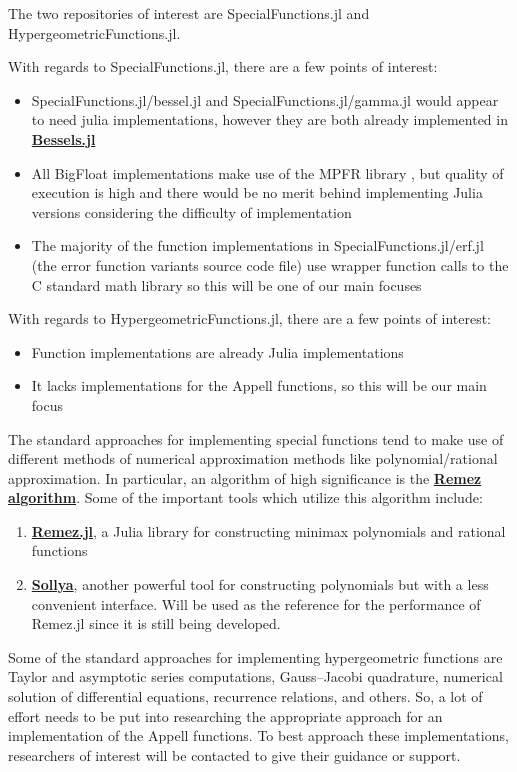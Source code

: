 \documentclass{article}
\theoremstyle{mytheoremstyle}
\theoremstyle{mytheoremstyle}
\theoremstyle{myproblemstyle}
\begin{document}
      The two repositories of interest are SpecialFunctions.jl and HypergeometricFunctions.jl. 

   \medskip
      With regards to SpecialFunctions.jl, there are a few points of interest: \begin{itemize}
        \item SpecialFunctions.jl/bessel.jl and SpecialFunctions.jl/gamma.jl would appear to need julia implementations, however they are both already implemented in \href{https://github.com/JuliaMath/Bessels.jl/tree/master}{\textbf{Bessels.jl}} 
        \item All BigFloat implementations make use of the MPFR library \cite{mpfr}, but quality of execution is high and there would be no merit behind implementing Julia versions considering the difficulty of implementation
        \item The majority of the function implementations in SpecialFunctions.jl/erf.jl (the error function variants source code file) use wrapper function calls to the C standard math library \cite{gnu clib} so this will be one of our main focuses
      \end{itemize}

      With regards to HypergeometricFunctions.jl, there are a few points of interest: \begin{itemize}
        \item Function implementations are already Julia implementations
        \item It lacks implementations for the Appell functions, so this will be our main focus
      \end{itemize}

      The standard approaches for implementing special functions tend to make use of different methods of numerical approximation methods like polynomial/rational approximation. 
      In particular, an algorithm of high significance is the \href{https://en.wikipedia.org/wiki/Remez_algorithm}{\textbf{Remez algorithm}}.
      Some of the important tools which utilize this algorithm include: \begin{enumerate}
        \item \href{https://github.com/simonbyrne/Remez.jl}{\textbf{Remez.jl}}, a Julia library for constructing minimax polynomials and rational functions 
        \item \href{https://www.sollya.org/}{\textbf{Sollya}}, another powerful tool for constructing polynomials but with a less convenient interface. Will be used as the reference for the performance of Remez.jl since it is still being developed.
      \end{enumerate}
      Some of the standard approaches for implementing hypergeometric functions are Taylor and asymptotic series computations, Gauss–Jacobi quadrature, numerical solution of differential equations, recurrence relations, and others.\cite{nmhg}
      So, a lot of effort needs to be put into researching the appropriate approach for an implementation of the Appell functions.
      To best approach these implementations, researchers of interest will be contacted to give their guidance or support.
    
\end{document}
